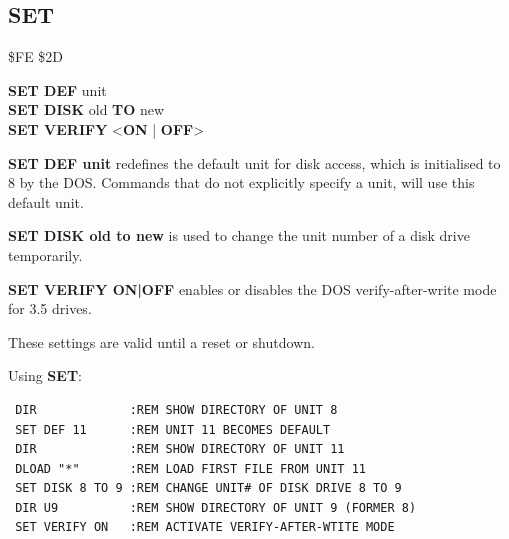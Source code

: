 
\newpage
\subsection{SET}
\begin{description}[leftmargin=2cm,style=nextline]
\item [Token:] \$FE \$2D
\item [Format:] {\bf SET DEF} unit \\
                {\bf SET DISK} old {\bf TO} new \\
                {\bf SET VERIFY} <{\bf ON} | {\bf OFF}>
\item [Usage:]  {\bf SET DEF unit} redefines the default unit
                for disk access, which is initialised to 8 by
                the DOS. Commands that do not explicitly
                specify a unit, will use this default unit.

                {\bf SET DISK old to new} is used to change
                the unit number of a disk drive temporarily.

                {\bf SET VERIFY ON|OFF} enables or disables
                the DOS verify-after-write mode for
                3.5 drives.

\item [Remarks:] These settings are valid until a reset
                 or shutdown.

\item [Examples:] Using {\bf SET}:
\begin{tcolorbox}[colback=black,coltext=white]
\verbatimfont{\codefont}
\begin{verbatim}
 DIR             :REM SHOW DIRECTORY OF UNIT 8
 SET DEF 11      :REM UNIT 11 BECOMES DEFAULT
 DIR             :REM SHOW DIRECTORY OF UNIT 11
 DLOAD "*"       :REM LOAD FIRST FILE FROM UNIT 11
 SET DISK 8 TO 9 :REM CHANGE UNIT# OF DISK DRIVE 8 TO 9
 DIR U9          :REM SHOW DIRECTORY OF UNIT 9 (FORMER 8)
 SET VERIFY ON   :REM ACTIVATE VERIFY-AFTER-WTITE MODE
\end{verbatim}
\end{tcolorbox}
\end{description}


\newpage
